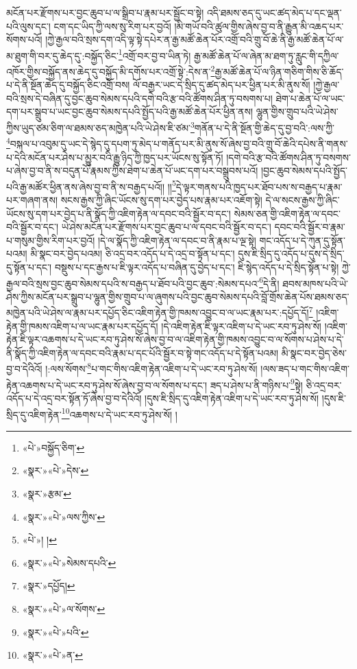 མངོན་པར་རྫོགས་པར་བྱང་ཆུབ་པ་ལ་སྒྲིབ་པ་རྣམ་པར་སྦྱོང་བ་སྟེ། འདི་ཐམས་ཅད་དུ་ཡང་ཚད་མེད་པ་དང་ལྡན་པའི་ལུས་དང་། ངག་དང་ཡིད་ཀྱི་ལས་སུ་རིག་པར་བྱའོ། །མི་གཡོ་བའི་ཚུལ་གྱིས་ཞེས་བྱ་བ་ནི་རྒྱུན་མི་འཆད་པར་སོགས་པའོ། །ཀྱེ་རྒྱལ་བའི་སྲས་དག་འདི་ལྟ་སྟེ་དཔེར་ན་རྒྱ་མཚོ་ཆེན་པོར་འགྲོ་བའི་གྲུ་བོ་ཆེ་ནི་རྒྱ་མཚོ་ཆེན་པོ་ལ་མ་ཐུག་གི་བར་དུ་ཆེད་དུ་:བསྐྱོད་ཅིང་\footnote{«པེ་»བསྐྱོད་ཅིག་}འགྲོ་བར་བྱ་བ་ཡིན་ཏེ། རྒྱ་མཚོ་ཆེན་པོ་ལ་ཞེན་མ་ཐག་ཏུ་རླུང་གི་དཀྱིལ་འཁོར་གྱིས་བསྐྱོད་ནས་ཆེད་དུ་བསྐྱོད་མི་དགོས་པར་འགྲོ་སྟེ་:དེས་ན་\footnote{«སྣར་»«པེ་»དེས་}རྒྱ་མཚོ་ཆེན་པོ་ལ་ཉིན་གཅིག་གིས་ཅི་ཆོད་པ་དེ་ནི་སྔོན་ཆེད་དུ་བསྐྱོད་ཅིང་འགྲོ་བས། ལོ་བརྒྱར་ཡང་དེ་སྲིད་དུ་ཚད་མེད་པར་ཕྱིན་པར་མི་ནུས་སོ། །ཀྱེ་རྒྱལ་བའི་སྲས་དེ་བཞིན་དུ་བྱང་ཆུབ་སེམས་དཔའི་དགེ་བའི་རྩ་བའི་ཚོགས་ཤིན་ཏུ་བསགས་པ། ཐེག་པ་ཆེན་པོ་ལ་ཡང་དག་པར་སྒྲུབ་པ་ཡང་བྱང་ཆུབ་སེམས་དཔའི་སྤྱོད་པའི་རྒྱ་མཚོ་ཆེན་པོར་ཕྱིན་ནས། ལྷུན་གྱིས་གྲུབ་པའི་ཡེ་ཤེས་ཀྱིས་ཡུད་ཙམ་ཅིག་ལ་ཐམས་ཅད་མཁྱེན་པའི་ཡེ་ཤེས་ཇི་ཙམ་\footnote{«སྣར་»རྩམ་}གནོན་པ་དེ་ནི་སྔོན་གྱི་ཆེད་དུ་བྱ་བའི་:ལས་ཀྱི་\footnote{«སྣར་»«པེ་»ལས་ཀྱིས་}བསྐལ་པ་འབུམ་དུ་ཡང་དེ་སྙེད་དུ་དཔག་ཏུ་མེད་པ་གནོད་པར་མི་ནུས་སོ་ཞེས་བྱ་བའི་གྲུ་བོ་ཆེའི་དཔེས་ནི་གནས་པ་དེའི་མངོན་པར་ཤེས་པ་མྱུར་བའི་རྒྱུ་ཉིད་ཀྱི་ཁྱད་པར་ཡོངས་སུ་སྟོན་ཏོ། །དགེ་བའི་རྩ་བའི་ཚོགས་ཤིན་ཏུ་བསགས་པ་ཞེས་བྱ་བ་ནི་ས་བདུན་པོ་རྣམས་ཀྱིས་ཐེག་པ་ཆེན་པོ་ཡང་དག་པར་བསྒྲུབས་པའོ། །བྱང་ཆུབ་སེམས་དཔའི་སྤྱོད་པའི་རྒྱ་མཚོར་ཕྱིན་ནས་ཞེས་བྱ་བ་ནི་ས་བརྒྱད་པའོ།། །།\footnote{«པེ་»། །}དེ་ལྟར་གནས་པའི་ཁྱད་པར་ཐོབ་པས་ས་བརྒྱད་པ་རྣམ་པར་གཞག་ནས། སངས་རྒྱས་ཀྱི་ཞིང་ཡོངས་སུ་དག་པར་བྱེད་པས་རྣམ་པར་འཇོག་སྟེ། དེ་ལ་སངས་རྒྱས་ཀྱི་ཞིང་ཡོངས་སུ་དག་པར་བྱེད་པ་ནི་སྣོད་ཀྱི་འཇིག་རྟེན་ལ་དབང་བའི་སྦྱོར་བ་དང་། སེམས་ཅན་གྱི་འཇིག་རྟེན་ལ་དབང་བའི་སྦྱོར་བ་དང་། ཡེ་ཤེས་མངོན་པར་རྫོགས་པར་བྱང་ཆུབ་པ་ལ་དབང་བའི་སྦྱོར་བ་དང་། དབང་བའི་སྦྱོར་བ་རྣམ་པ་གསུམ་གྱིས་རིག་པར་བྱའོ། །དེ་ལ་སྣོད་ཀྱི་འཇིག་རྟེན་ལ་དབང་བ་ནི་རྣམ་པ་ལྔ་སྟེ། གང་འདོད་པ་དེ་ཀུན་དུ་སྟོན་པའམ། མི་སྣང་བར་བྱེད་པའམ། ཅི་འདྲ་བར་འདོད་པ་དེ་འདྲ་བ་སྟོན་པ་དང་། དུས་ཇི་སྲིད་དུ་འདོད་པ་དུས་དེ་སྲིད་དུ་སྟོན་པ་དང་། བསྡུས་པ་དང་རྒྱས་པ་ཇི་ལྟར་འདོད་པ་བཞིན་དུ་བྱེད་པ་དང་། ཇི་སྙེད་འདོད་པ་དེ་སྲིད་སྟོན་པ་སྟེ། ཀྱེ་རྒྱལ་བའི་སྲས་བྱང་ཆུབ་སེམས་དཔའི་ས་བརྒྱད་པ་ཐོབ་པའི་བྱང་ཆུབ་:སེམས་དཔའ་\footnote{«སྣར་»«པེ་»སེམས་དཔའི་}དེ་ནི། ཐབས་མཁས་པའི་ཡེ་ཤེས་ཀྱིས་མངོན་པར་སྒྲུབ་པ་ལྷུན་གྱིས་གྲུབ་པ་ལ་ཞུགས་པའི་བྱང་ཆུབ་སེམས་དཔའི་བློ་གྲོས་ཆེན་པོས་ཐམས་ཅད་མཁྱེན་པའི་ཡེ་ཤེས་ལ་རྣམ་པར་དཔྱོད་ཅིང་འཇིག་རྟེན་གྱི་ཁམས་འབྱུང་བ་ལ་ཡང་རྣམ་པར་:དཔྱོད་དོ།\footnote{«སྣར་»དཔྱོད།} །འཇིག་རྟེན་གྱི་ཁམས་འཇིག་པ་ལ་ཡང་རྣམ་པར་དཔྱོད་དོ། །དེ་འཇིག་རྟེན་ཇི་ལྟར་འཇིག་པ་དེ་ཡང་རབ་ཏུ་ཤེས་སོ། །འཇིག་རྟེན་ཇི་ལྟར་འཆགས་པ་དེ་ཡང་རབ་ཏུ་ཤེས་སོ་ཞེས་བྱ་བ་ལ་འཇིག་རྟེན་གྱི་ཁམས་འབྱུང་བ་ལ་སོགས་པ་ཤེས་པ་དེ་ནི་སྣོད་ཀྱི་འཇིག་རྟེན་ལ་དབང་བའི་རྣམ་པ་དང་པོའི་སྦྱོར་བ་སྟེ་གང་འདོད་པ་དེ་སྟོན་པའམ། མི་སྣང་བར་བྱེད་ཅེས་བྱ་བ་དེའིའོ། །:ལས་སོགས་\footnote{«སྣར་»«པེ་»ལ་སོགས་}པ་གང་གིས་འཇིག་རྟེན་འཇིག་པ་དེ་ཡང་རབ་ཏུ་ཤེས་སོ། །ལས་ཟད་པ་གང་གིས་འཇིག་རྟེན་འཆགས་པ་དེ་ཡང་རབ་ཏུ་ཤེས་སོ་ཞེས་བྱ་བ་ལ་སོགས་པ་དང་། ཟད་པ་ཤེས་པ་ནི་གཉིས་པ་\footnote{«སྣར་»«པེ་»པའི་}སྟེ། ཅི་འདྲ་བར་འདོད་པ་དེ་འདྲ་བར་སྟོན་ཏོ་ཞེས་བྱ་བ་དེའིའོ། །དུས་ཇི་སྲིད་དུ་འཇིག་རྟེན་འཇིག་པ་དེ་ཡང་རབ་ཏུ་ཤེས་སོ། །དུས་ཇི་སྲིད་དུ་འཇིག་རྟེན་\footnote{«སྣར་»«པེ་»ན་}འཆགས་པ་དེ་ཡང་རབ་ཏུ་ཤེས་སོ། །
